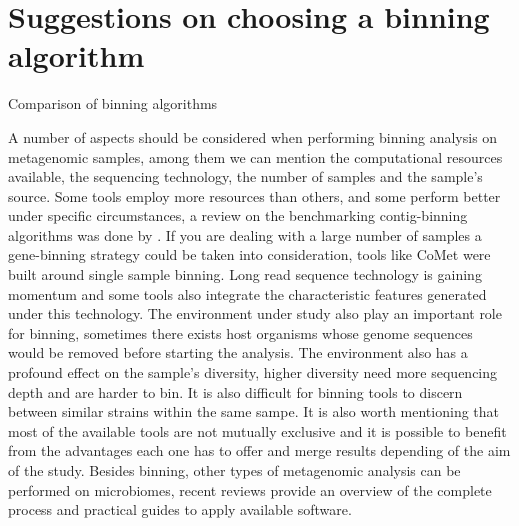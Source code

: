 \documentclass{article}
\begin{document}
\section{Suggestions on choosing a binning algorithm}
\begin{table}
\begin{tiny}
\centering
\caption[Comparison of binning algorithms]{Comparison of binning algorithms}
	
\label{Tbinningsoftware}
\end{tiny}
\end{table}
A number of aspects should be considered when performing binning analysis on metagenomic samples, among them we can mention the computational resources available, the sequencing technology, the number of samples and the sample's source.
Some tools employ more resources than others, and some perform better under specific circumstances, a review on the benchmarking contig-binning algorithms was done by .
If you are dealing with a large number of samples a gene-binning strategy could be taken into consideration, tools like CoMet were built around single sample binning. Long read sequence technology is gaining momentum and some tools also integrate the characteristic features generated under this technology.
The environment under study also play an important role for binning, sometimes there exists host organisms whose genome sequences would be removed before starting the analysis. The environment also has a profound effect on the sample's diversity, higher diversity need more sequencing depth and are harder to bin. It is also difficult for binning tools to discern between similar strains within the same sampe.  
It is also worth mentioning that most of the available tools are not mutually exclusive and it is possible to benefit from the advantages each one has to offer and merge results depending of the aim of the study.
Besides binning, other types of metagenomic analysis can be performed on microbiomes, recent reviews provide an overview of the complete process and practical guides to apply available software.  

\end{document}
